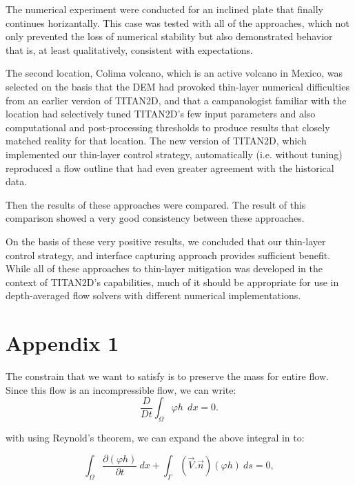 \documentclass[letterpaper,10pt]{article}
\begin{document}
The numerical experiment were conducted for an inclined plate that finally continues horizantally. 
This case was tested with all of the approaches,
which not only prevented the 
loss of numerical stability but also demonstrated behavior that
is, at least qualitatively, consistent with expectations.

The second location, Colima volcano, which is an active volcano 
in Mexico, was selected on the basis that the DEM had provoked 
thin-layer numerical difficulties from an earlier version of TITAN2D, 
and that a campanologist familiar with the location had selectively 
tuned TITAN2D's few input parameters and also computational and 
post-processing thresholds to produce results that closely matched 
reality for that location. The new version of TITAN2D, which implemented
our thin-layer control strategy, automatically (i.e. without 
tuning) reproduced a flow outline that had even greater agreement 
with the historical data. 

Then the results of these approaches were compared. The result of this comparison showed 
a very good consistency between these approaches.

On the basis of these very positive results, we concluded that our 
thin-layer control strategy, and interface capturing approach provides sufficient benefit. 
While all of these approaches to thin-layer mitigation was developed in the 
context of TITAN2D's capabilities, much of it should be appropriate 
for use in depth-averaged flow solvers with different numerical 
implementations.

\newpage
\appendix
\section{Appendix 1} \label{app1}

The constrain that we want to satisfy is to preserve the mass for entire flow. Since this flow is an incompressible flow, we can write:
\begin{equation} 
\frac{D}{Dt} \int_\Omega \varphi h \ \ dx= 0.
\end{equation}

with using Reynold's theorem, we can expand the above integral in to:

\begin{equation} \label{reycons}
\int_\Omega \frac{\partial (\varphi h)}{\partial t} \ dx + \int_\Gamma (\overrightarrow{V}.\overrightarrow{n}) (\varphi h)\  ds = 0,
\end{equation}
\end{document}
